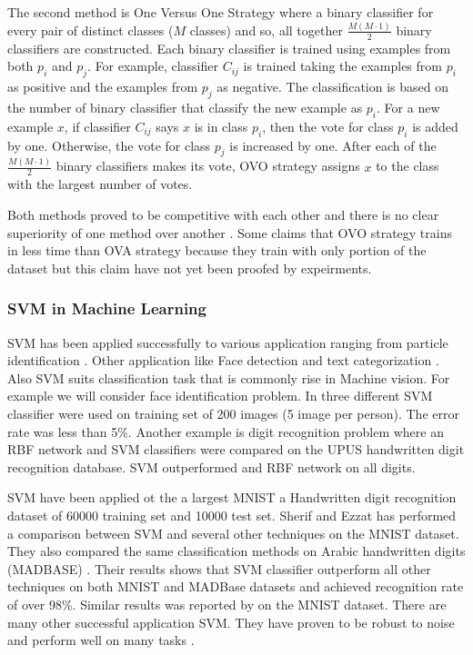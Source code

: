  The second method is One Versus One Strategy where a binary classifier for every pair of distinct classes ($M$ classes) and so, all together $\frac{M(M \cdot 1)}{2}$ binary classifiers are constructed. Each binary classifier is trained using examples from both $p_i$ and $p_j$. For example, classifier $C_{ij}$ is trained taking the examples from $p_i$ as positive and the examples from $p_j$ as negative. The classification is based on the number of binary classifier that classify the new example as $p_i$. For a new example $x$, if classifier $C_{ij}$ says $x$ is in class $p_i$, then the vote for class $p_i$ is added by one. Otherwise, the vote for class $p_j$ is increased by one. After each of the $\frac{M(M \cdot 1)}{2}$  binary classifiers makes its vote,  OVO strategy assigns $x$ to the class with the largest number of votes. 
 
 Both methods proved to be competitive with each other and there is no clear superiority of one method
over another \cite{Duan05whichis}. Some claims that OVO strategy trains in less time than OVA strategy because they train with only portion of the dataset \cite{libsvm} but this claim have not yet been proofed by expeirments.  


\subsubsection{ SVM in Machine Learning }
SVM has been applied successfully to various application ranging from particle identification \cite{ParticleSVM7}. Other application like Face detection \cite{faceSVM8,faceSVM7} and text categorization \cite{TextSVM7}. Also SVM suits classification task that is commonly rise in Machine vision. For example we will consider face identification\cite{faceSVM8} problem. In \cite{faceSVM8} three different SVM classifier were used on training set of 200 images (5 image per person). The error rate was less than 5\%. Another example is digit recognition problem where an RBF network and SVM classifiers were compared on the UPUS handwritten digit recognition database\cite{ORLDataset}.  SVM outperformed and RBF network on all digits.  


SVM have been applied ot the a largest MNIST a Handwritten digit recognition dataset of 60000 training set and 10000 test set\cite{IjdarSherifPaper}. Sherif and Ezzat has performed a comparison between SVM and several other techniques on the MNIST dataset. They also compared the same classification methods on Arabic handwritten digits (MADBASE) \cite{ADBase9,IjdarSherifPaper}. Their results shows that SVM classifier outperform all other techniques on both MNIST and MADBase datasets and achieved recognition rate of over 98\%. Similar results was reported by \cite{empiricalcomp11,SVMInvariantComDecoste02} on the MNIST dataset. There are many other successful application SVM. They have proven to be robust to noise and perform well on many tasks \cite{empiricalcomp11,Scholkopf97comparingsupport}. 


